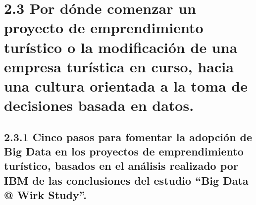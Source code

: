 \documentclass[
  letterpaper,
  DIV=11,
  numbers=noendperiod]{scrreprt}
\begin{document}
\hypertarget{por-duxf3nde-comenzar-un-proyecto-de-emprendimiento-turuxedstico-o-la-modificaciuxf3n-de-una-empresa-turuxedstica-en-curso-hacia-una-cultura-orientada-a-la-toma-de-decisiones-basada-en-datos.}{%
\section{2.3 Por dónde comenzar un proyecto de emprendimiento turístico
o la modificación de una empresa turística en curso, hacia una cultura
orientada a la toma de decisiones basada en
datos.}\label{por-duxf3nde-comenzar-un-proyecto-de-emprendimiento-turuxedstico-o-la-modificaciuxf3n-de-una-empresa-turuxedstica-en-curso-hacia-una-cultura-orientada-a-la-toma-de-decisiones-basada-en-datos.}}

\hypertarget{cinco-pasos-para-fomentar-la-adopciuxf3n-de-big-data-en-los-proyectos-de-emprendimiento-turuxedstico-basados-en-el-anuxe1lisis-realizado-por-ibm-de-las-conclusiones-del-estudio-big-data-wirk-study.}{%
\subsection{2.3.1 Cinco pasos para fomentar la adopción de Big Data en
los proyectos de emprendimiento turístico, basados en el análisis
realizado por IBM de las conclusiones del estudio ``Big Data @ Wirk
Study''.}\label{cinco-pasos-para-fomentar-la-adopciuxf3n-de-big-data-en-los-proyectos-de-emprendimiento-turuxedstico-basados-en-el-anuxe1lisis-realizado-por-ibm-de-las-conclusiones-del-estudio-big-data-wirk-study.}}
\end{document}
